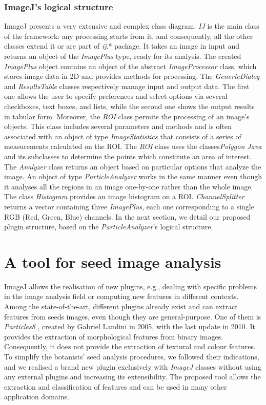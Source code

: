 \documentclass[a4paper,12pt]{article}
\begin{document}
\subsubsection{ImageJ's logical structure}
ImageJ presents a very extensive and complex class diagram.
\emph{IJ} is the main class of the framework: any processing starts from it, and consequently, all the other classes extend it or are part of \emph{ij}.* package. It takes an image in input and returns an object of the \emph{ImagePlus} type, ready for its analysis.
The created \emph{ImagePlus} object contains an object of the abstract \emph{ImageProcessor} class, which stores image data in 2D and provides methods for processing.
The \emph{GenericDialog} and \emph{ResultsTable} classes respectively manage input and output data. The first one allows the user to specify preferences and select options via several checkboxes, text boxes, and lists, while the second one shows the output results in tabular form. Moreover, the \emph{ROI} class permits the processing of an image's objects.
This class includes several parameters and methods and is often associated with an object of type \emph{ImageStatistics} that consists of a series of measurements calculated on the ROI. The \emph{ROI} class uses the classes\emph{Polygon Java } and its subclasses to determine the points which constitute an area of interest. The \emph{Analyzer} class returns an object based on particular options that analyze the image. An object of type \emph{ParticleAnalyzer} works in the same manner even though it analyses all the regions in an image one-by-one rather than the whole image. 
The class \emph{Histogram} provides an image histogram on a ROI. 
\emph{ChannelSplitter} returns a vector containing three \emph{ImagePlus}, each one corresponding to a single RGB (Red, Green, Blue) channels.
In the next section, we detail our proposed plugin structure, based on the \emph{ParticleAnalyzer}'s logical structure.

\section{A tool for seed image analysis}
ImageJ allows the realisation of new plugins, e.g., dealing with specific problems in the image analysis field or computing new features in different contexts.
Among the state-of-the-art, different plugins already exist and can extract features from seeds images, even though they are general-purpose. One of them is \emph{Particles8} \cite{Landini}, created by Gabriel Landini in 2005, with the last update in 2010. It provides the extraction of morphological features from binary images. Consequently, it does not provide the extraction of textural and colour features.
To simplify the botanists' seed analysis procedures, we followed their indications, and we realised a brand new plugin exclusively with \emph{ImageJ} classes without using any external plugins and increasing its extensibility. The proposed tool allows the extraction and classification of features and can be used in many other application domains.
\end{document}
